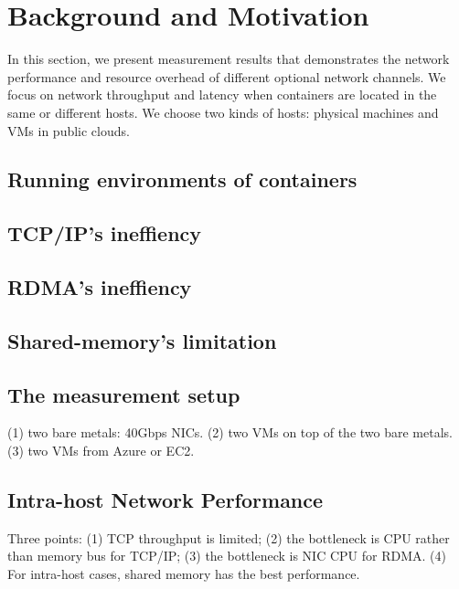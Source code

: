 \section{Background and Motivation}
\label{sec:motivation}

In this section, we present measurement results that demonstrates the network performance and resource overhead of different optional network channels. We focus on network throughput and latency when containers are located in the same or different hosts. 
We choose two kinds of hosts: physical machines and VMs in public clouds.

\subsection{Running environments of containers}


\subsection{TCP/IP's ineffiency}

\subsection{RDMA's ineffiency}

\subsection{Shared-memory's limitation}



\subsection{The measurement setup}
(1) two bare metals: 40Gbps NICs.
(2) two VMs on top of the two bare metals.
(3) two VMs from Azure or EC2.

\subsection{Intra-host Network Performance}


Three points: (1) TCP throughput is limited; (2) the bottleneck is CPU rather than memory bus for TCP/IP; (3) the bottleneck is NIC CPU for RDMA. (4) For intra-host cases, shared memory has the best performance.

